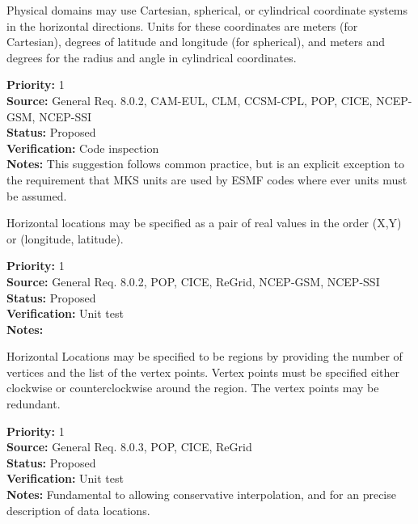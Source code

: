 

Physical domains may use Cartesian, spherical, or cylindrical coordinate
systems in the horizontal directions.  Units for these coordinates are meters
(for Cartesian), degrees of latitude and longitude (for spherical), and meters
and degrees for the radius and angle in cylindrical coordinates.

\begin{reqlist}
{\bf Priority:} 1 \\
{\bf Source:} General Req. 8.0.2, CAM-EUL, CLM, CCSM-CPL, POP, CICE, NCEP-GSM, NCEP-SSI \\
{\bf Status:} Proposed \\
{\bf Verification:} Code inspection\\
{\bf Notes:}  This suggestion follows common practice, but is an explicit
exception to the requirement that MKS units are used by ESMF codes where ever
units must be assumed.
\end{reqlist}


   Horizontal locations may be specified as a pair of real values in the order
(X,Y) or (longitude, latitude).
\begin{reqlist}
{\bf Priority:} 1 \\
{\bf Source:} General Req. 8.0.2, POP, CICE, ReGrid, NCEP-GSM, NCEP-SSI \\
{\bf Status:} Proposed \\
{\bf Verification:} Unit test\\
{\bf Notes:} 
\end{reqlist}



  Horizontal Locations may be specified to be regions by providing the number
of vertices and the list of the vertex points.  Vertex points must be specified
either clockwise or counterclockwise around the region.  The vertex points
may be redundant.
\begin{reqlist}
{\bf Priority:} 1 \\
{\bf Source:} General Req. 8.0.3, POP, CICE, ReGrid \\
{\bf Status:} Proposed \\
{\bf Verification:} Unit test\\
{\bf Notes:} Fundamental to allowing conservative interpolation, and for an
precise description of data locations.
\end{reqlist}
 
